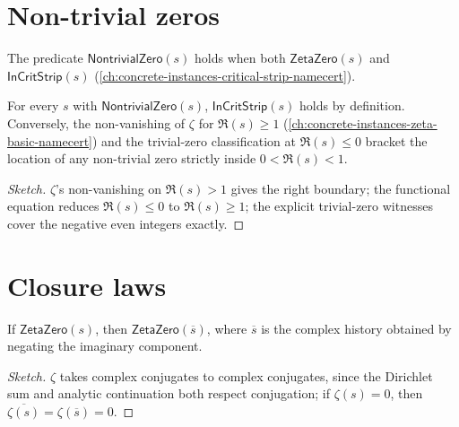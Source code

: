 \section{Non-trivial zeros}

\begin{definition}
\label{def:nontrivial-zero}
The predicate \(\mathsf{NontrivialZero}(s)\) holds when both \(\mathsf{ZetaZero}(s)\) and \(\mathsf{InCritStrip}(s)\) (\autoref{ch:concrete-instances-critical-strip-namecert}).
\end{definition}

\begin{theorem}
\label{thm:nontrivial-zero-in-strip}
For every \(s\) with \(\mathsf{NontrivialZero}(s)\), \(\mathsf{InCritStrip}(s)\) holds by definition. Conversely, the non-vanishing of \(\zeta\) for \(\Re(s) \geq 1\) (\autoref{ch:concrete-instances-zeta-basic-namecert}) and the trivial-zero classification at \(\Re(s) \leq 0\) bracket the location of any non-trivial zero strictly inside \(0 < \Re(s) < 1\).
\end{theorem}
\begin{proof}[Sketch]
\(\zeta\)'s non-vanishing on \(\Re(s) > 1\) gives the right boundary; the functional equation reduces \(\Re(s) \leq 0\) to \(\Re(s) \geq 1\); the explicit trivial-zero witnesses cover the negative even integers exactly.
\end{proof}

\section{Closure laws}

\begin{theorem}
\label{thm:conjugate-symmetric}
If \(\mathsf{ZetaZero}(s)\), then \(\mathsf{ZetaZero}(\overline{s})\), where \(\overline{s}\) is the complex history obtained by negating the imaginary component.
\end{theorem}
\begin{proof}[Sketch]
\(\zeta\) takes complex conjugates to complex conjugates, since the Dirichlet sum and analytic continuation both respect conjugation; if \(\zeta(s) = 0\), then \(\overline{\zeta(s)} = \zeta(\overline{s}) = 0\).
\end{proof}

